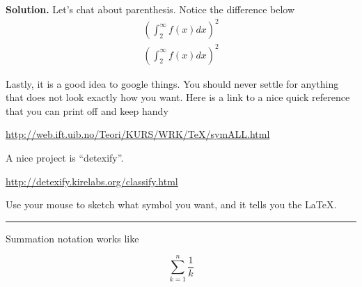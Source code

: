 \documentclass[10pt,leqno ]{article}
\theoremstyle{definition}
\newenvironment{solution}[1][Solution]{\begin{doublespace}\textbf{#1.}\quad }{\ \rule{0.5em}{0.5em}\end{doublespace}}
\begin{document}
\begin{solution}
Let's chat about parenthesis.
Notice the difference below
\begin{align*}
(\int_2^\infty f(x) dx)^2 \\ %
\left( \int_2^\infty f(x) dx \right)^2 %
\end{align*}

Lastly, it is a good idea to google things. You should never settle for anything that does not
look exactly how you want. Here is a link to a nice quick reference that you can print off and 
keep handy
\begin{center}
\url{http://web.ift.uib.no/Teori/KURS/WRK/TeX/symALL.html}
\end{center}
A nice project is ``detexify''.
\begin{center}
\url{http://detexify.kirelabs.org/classify.html}
\end{center}
Use  your mouse to sketch what symbol you want, and it tells you the \LaTeX .
\end{solution}

Summation notation works like

$$\sum_{k=1}^n \frac{1}{k}  $$
\end{document}
